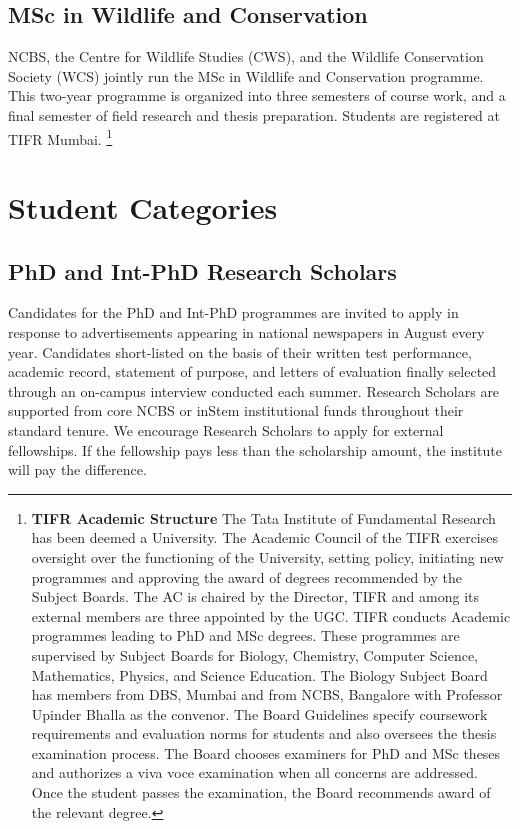 \documentclass[a4paper]{extarticle}
\begin{document}
\subsection{MSc in Wildlife and Conservation} NCBS, the Centre for Wildlife
Studies (CWS), and the Wildlife Conservation Society (WCS) jointly run the MSc
in Wildlife and Conservation programme. This two-year programme is organized
into three semesters of course work, and a final semester of field research and
thesis preparation. Students are registered at TIFR Mumbai. \footnote{
    \textbf{TIFR Academic Structure} The Tata Institute of Fundamental Research
    has been deemed a University. The Academic Council of the TIFR exercises
    oversight over the functioning of the University, setting policy, initiating
    new programmes and approving the award of degrees recommended by the Subject
    Boards. The AC is chaired by the Director, TIFR and among its external
    members are three appointed by the UGC. TIFR conducts Academic programmes
    leading to PhD and MSc degrees. These programmes are supervised by Subject
    Boards for Biology, Chemistry, Computer Science, Mathematics, Physics, and
    Science Education. The Biology Subject Board has members from DBS, Mumbai
    and from NCBS, Bangalore with Professor Upinder Bhalla as the convenor. The
    Board Guidelines specify coursework requirements and evaluation norms for
    students and also oversees the thesis examination process. The Board chooses
    examiners for PhD and MSc theses and authorizes a viva voce examination when
    all concerns are addressed. Once the student passes the examination, the
    Board recommends award of the relevant degree.
}


\section{Student Categories}

\subsection{PhD and Int-PhD Research Scholars}

Candidates for the PhD and Int-PhD programmes are invited to apply in response
to advertisements appearing in national newspapers in August every year.
Candidates short-listed on the basis of their written test performance, academic
record, statement of purpose, and letters of evaluation finally selected through
an on-campus interview conducted each summer. Research Scholars are supported
from core NCBS or inStem institutional funds throughout their standard tenure.
We encourage Research Scholars to apply for external fellowships. If the
fellowship pays less than the scholarship amount, the institute will pay the
difference.  
\end{document}
